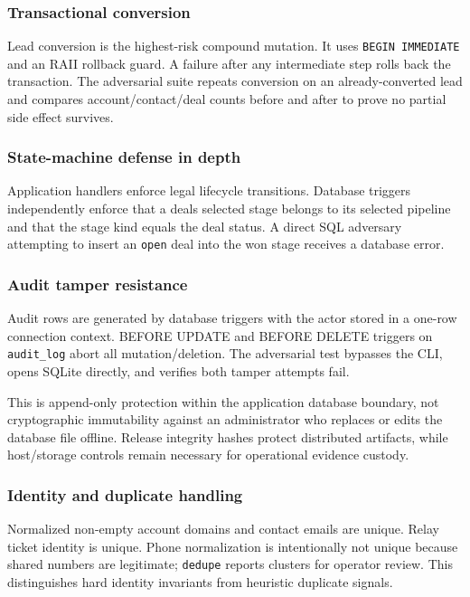 \documentclass[
]{article}
\begin{document}
\subsubsection{Transactional conversion}\label{transactional-conversion}

Lead conversion is the highest-risk compound mutation. It uses
\texttt{BEGIN\ IMMEDIATE} and an RAII rollback guard. A failure after
any intermediate step rolls back the transaction. The adversarial suite
repeats conversion on an already-converted lead and compares
account/contact/deal counts before and after to prove no partial side
effect survives.

\subsubsection{State-machine defense in
depth}\label{state-machine-defense-in-depth}

Application handlers enforce legal lifecycle transitions. Database
triggers independently enforce that a deal\textquotesingle s selected
stage belongs to its selected pipeline and that the stage kind equals
the deal status. A direct SQL adversary attempting to insert an
\texttt{open} deal into the won stage receives a database error.

\subsubsection{Audit tamper resistance}\label{audit-tamper-resistance}

Audit rows are generated by database triggers with the actor stored in a
one-row connection context. BEFORE UPDATE and BEFORE DELETE triggers on
\texttt{audit\_log} abort all mutation/deletion. The adversarial test
bypasses the CLI, opens SQLite directly, and verifies both tamper
attempts fail.

This is append-only protection within the application database boundary,
not cryptographic immutability against an administrator who replaces or
edits the database file offline. Release integrity hashes protect
distributed artifacts, while host/storage controls remain necessary for
operational evidence custody.

\subsubsection{Identity and duplicate
handling}\label{identity-and-duplicate-handling}

Normalized non-empty account domains and contact emails are unique.
Relay ticket identity is unique. Phone normalization is intentionally
not unique because shared numbers are legitimate; \texttt{dedupe}
reports clusters for operator review. This distinguishes hard identity
invariants from heuristic duplicate signals.
\end{document}

